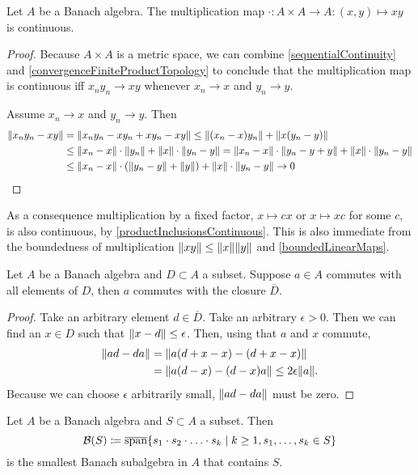 \begin{lemma} \label{multiplicationContinuous}
Let $A$ be a Banach algebra. The multiplication map $\cdot: A\times A \to A: (x,y)\mapsto xy$ is continuous.
\end{lemma}
\begin{proof}
Because $A\times A$ is a metric space, we can combine \ref{sequentialContinuity} and \ref{convergenceFiniteProductTopology} to conclude that the multiplication map is continuous iff $x_ny_n \to xy$ whenever $x_n \to x$ and $y_n \to y$.

Assume $x_n \to x$ and $y_n \to y$. Then
\begin{align*}
\lVert x_ny_n - xy\rVert &= \lVert x_ny_n - xy_n + xy_n - xy\rVert \leq \lVert(x_n-x)y_n\rVert+ \lVert x(y_n-y)\rVert\\ 
&\leq \lVert x_n-x\rVert\cdot\lVert y_n\rVert+ \lVert x\rVert\cdot\lVert y_n-y\rVert = \lVert x_n-x\rVert\cdot\lVert y_n-y+y\rVert+ \lVert x\rVert\cdot\lVert y_n-y\rVert\\
&\leq \lVert x_n-x\rVert\cdot(\lVert y_n-y\rVert + \lVert y\rVert)+ \lVert x\rVert\cdot\lVert y_n-y\rVert \to 0
\end{align*}
\end{proof}
As a consequence multiplication by a fixed factor, $x\mapsto cx$ or $x\mapsto xc$ for some $c$, is also continuous, by \ref{productInclusionsContinuous}. This is also immediate from the boundedness of multiplication $\lVert xy\rVert\leq\lVert x\rVert\lVert y\rVert$ and \ref{boundedLinearMaps}.

\begin{lemma}
Let $A$ be a Banach algebra and $D\subset A$ a subset. Suppose $a\in A$ commutes with all elements of $D$, then $a$ commutes with the closure $\overline{D}$.
\end{lemma}
\begin{proof}
Take an arbitrary element $d\in \overline{D}$. Take an arbitrary $\epsilon >0$. Then we can find an $x\in D$ such that $\lVert x-d\rVert\leq \epsilon$. Then, using that $a$ and $x$ commute,
\begin{align*}
\lVert ad - da\rVert &= \lVert a(d+x-x) - (d+x-x)\rVert \\
&= \lVert a(d-x) - (d-x)a\rVert \leq 2\epsilon \lVert a\rVert.
\end{align*}
Because we can choose $\epsilon$ arbitrarily small, $\lVert ad - da\rVert$ must be zero.
\end{proof}

\begin{proposition} \label{smallestBanachAlgebra}
Let $A$ be a Banach algebra and $S\subset A$ a subset. Then
\[ \mathcal{B}(S) \defeq \overline{\Span}\setbuilder{s_1\cdot s_2 \cdot \ldots \cdot s_k}{k\geq 1, s_1,\ldots, s_k \in S} \]
is the smallest Banach subalgebra in $A$ that contains $S$.
\end{proposition}

